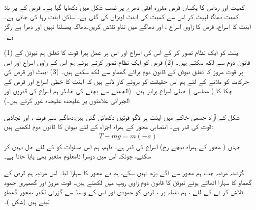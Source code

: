 \\
کمیت   اور رداس  کا یکساں قرص مقررہ افقی دھرے پر نصب  شکل  میں دکھایا گیا ہے۔ قرص کے پر بلا کمیت  دھاگا لپیٹ کر اس سے   کمیت  کی اینٹ آویزاں کی  گئی ہے۔ ساکن اینٹ رہا کی جاتی ہے۔ اینٹ کا  اسراع، قرص کا  زاوی  اسراع ، اور دھاگے میں تناو تلاش کریں۔دھاگہ پھسلتا  نہیں  اور دھرا   بے رگڑ ہے۔

(1)  اینٹ کو ایک نظام تصور کر کے اس کی اسراع  اور اس پر عمل پیرا قوت کا تعلق ہم نیوٹن کے قانون دوم  سے لکھ سکتے ہیں۔
(2) قرص کو ایک نظام تصور کرتے ہوئے ہم اس کے  زاوی اسراع    اور  اس پر قوت مروڑ   کا تعلق  نیوٹن کے قانون دوم برائے گھماو   سے لکھ سکتے ہیں۔ (3)  اینٹ اور قرص  کی حرکات  کو ملانے کے لئے ہم اس حقیقت کو بروئے کار لاتے ہیں کہ اینٹ کا  خطی اسراع  اور قرص کے    چکا   کا (  مماسی ) خطی  اسراع    برابر ہیں۔ (الجھنے سے بچنے کی خاطر ہم اسراع  کی قدروں اور الجبرائی  علامتوں  پر علیحدہ علیحدہ غور کرتے ہیں۔)

\quad
شکل  کے  آزاد جسمی  خاکے  میں اینٹ پر لاگو قوتیں  دکھائی گئی ہیں:دھاگے سے قوت ، اور تجاذبی قوت  کی قدر  ہے۔    انتصابی   محور کے ہمراہ  اجزاء کے لئے نیوٹن کا قانون دوم   لکھتے ہیں:
\begin{align}\label{مساوات_گھماو_نمونی_قرص_مروڑ}
T-mg=m(-a)
\end{align}
جہاں (  محور  کے ہمراہ نیچے رخ)  اسراع  کی قدر  ہے۔ تاہم،   ہم اس  مساوات کو  کے لئے حل نہیں کر سکتے، چونکہ اس میں دوسرا نامعلوم متغیر  بھی پایا جاتا ہے۔

\quad
گزشتہ مرتبہ جب ہم محور   سے آگے بڑھ نہیں سکے، ہم  نے محور  کا سہارا لیا۔ اس مرتبہ ہم قرص کے گھماو کا سہارا اٹھاتے  ہوئے نیوٹن کا قانون دوم  زاوی روپ میں لکھتے ہیں۔ قوت مروڑ اور گھمیری جمود   تلاش کر نے کے لئے ، ہم نقطہ  پر ، قرص کو عمودی اور اس  کے وسط سے گزرتی لکیر  ،محور گھماو  لیتے ہیں (شکل )۔


